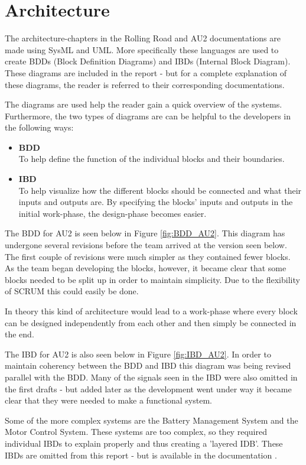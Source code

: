 \chapter{Architecture} 
The architecture-chapters in the Rolling Road and AU2 documentations are made using SysML and UML. More specifically these languages are used to create BDDs (Block Definition Diagrams) and IBDs (Internal Block Diagram). These diagrams are included in the report - but for a complete explanation of these diagrams, the reader is referred to their corresponding documentations.

The diagrams are used help the reader gain a quick overview of the systems. Furthermore, the two types of diagrams are can be helpful to the developers in the following ways:
\begin{itemize}
	\item \textbf{BDD}\\
	To help define the function of the individual blocks and their boundaries. 
	\item \textbf{IBD}\\
	To help visualize how the different blocks should be connected and what their inputs and outputs are. By specifying the blocks' inputs and outputs in the initial work-phase, the design-phase becomes easier.
\end{itemize}

The BDD for AU2 is seen below in Figure \vref{fig:BDD_AU2}. This diagram has undergone several revisions before the team arrived at the version seen below. The first couple of revisions were much simpler as they contained fewer blocks. As the team began developing the blocks, however, it became clear that some blocks needed to be split up in order to maintain simplicity. Due to the flexibility of SCRUM this could easily be done.

In theory this kind of architecture would lead to a work-phase where every block can be designed independently from each other and then simply be connected in the end.

The IBD for AU2 is also seen below in Figure \vref{fig:IBD_AU2}. In order to maintain coherency between the BDD and IBD this diagram was being revised parallel with the BDD. Many of the signals seen in the IBD were also omitted in the first drafts - but added later as the development went under way it became clear that they were needed to make a functional system.

Some of the more complex systems are the Battery Management System and the Motor Control System. These systems are too complex, so they required individual IBDs to explain properly and thus creating a 'layered IDB'. These IBDs are omitted from this report - but is available in the documentation .


